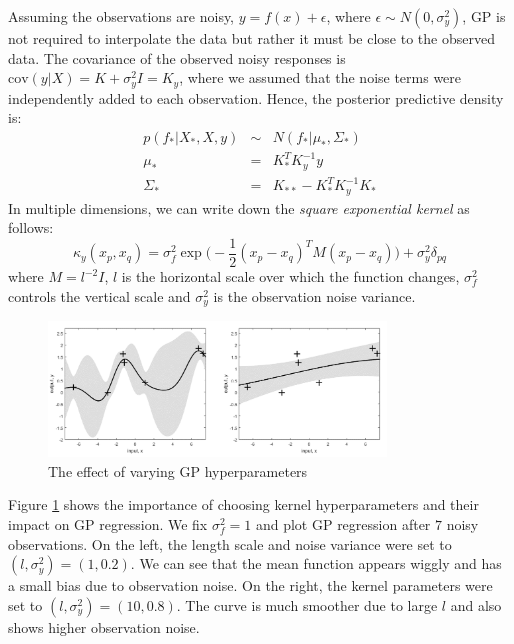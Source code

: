 Assuming the observations are noisy, $y=f(x)+\epsilon$, where $\epsilon \sim N(0,\sigma_{y}^{2})$, GP is not required to interpolate the data but rather it must be close to the observed data. The covariance of the observed noisy responses is $\mathrm{cov}(y|X) = K + \sigma_{y}^{2}I = K_{y}$, where we assumed that the noise terms were independently added to each observation. Hence, the posterior predictive density is:
\begin{eqnarray}
    p(f_{\ast}|X_{\ast}, X, y) &\sim& N(f_{\ast}|\mu_{\ast},\Sigma_{\ast})\\
    \mu_{\ast} &=& K_{\ast}^{T}K_{y}^{-1}y\\
    \Sigma_{\ast} &=& K_{\ast\ast} - K_{\ast}^{T}K_{y}^{-1}K_{\ast}
\end{eqnarray}
In multiple dimensions, we can write down the \textit{square exponential kernel} as follows:
\begin{equation}
    \kappa_{y}(x_p, x_q) = \sigma_{f}^{2}\exp\big(-\frac{1}{2}(x_p-x_q)^{T}M(x_p-x_q)\big) + \sigma_{y}^{2}\delta_{pq}
\end{equation}
where $M = l^{-2}I$, $l$ is the horizontal scale over which the function changes, $\sigma_{f}^{2}$ controls the vertical scale and $\sigma_{y}^{2}$ is the observation noise variance. 

\begin{figure}[tbhp]
    \centering
    \includegraphics[width=0.8\textwidth, trim={10 10 10 10}]{figures/gp34.png}
    \caption{The effect of varying GP hyperparameters}
    \label{fig:gp34}
\end{figure}
Figure \ref{fig:gp34} shows the importance of choosing kernel hyperparameters and their impact  on GP regression. We fix $\sigma_{f}^{2} = 1$ and plot GP regression after $7$ noisy observations. On the left, the length scale and noise variance were set to $(l,\sigma_{y}^{2}) = (1, 0.2)$. We can see that the mean function appears wiggly and has a small bias due to observation noise. On the right, the kernel parameters were set to $(l,\sigma_{y}^{2}) = (10,0.8)$. The curve is much smoother due to large $l$ and also shows higher observation noise. 

